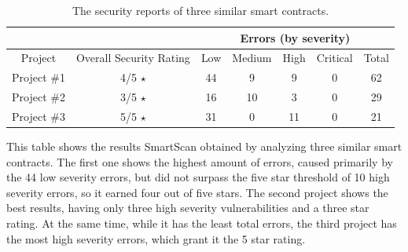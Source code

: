 \begin{table}[h]
\begin{tabular}{cc|ccccc|}
\cline{3-7}
                                  &                                               & \multicolumn{5}{c|}{Errors (by severity)}                                                                                  \\ \hline
\multicolumn{1}{|c|}{Project}     & Overall Security Rating                       & \multicolumn{1}{c|}{Low} & \multicolumn{1}{c|}{Medium} & \multicolumn{1}{c|}{High} & \multicolumn{1}{c|}{Critical} & Total \\ \hline
\multicolumn{1}{|c|}{Project \#1 \cite{sampleProject1}} & 4/5 $\star$             & \multicolumn{1}{c|}{44}  & \multicolumn{1}{c|}{9}      & \multicolumn{1}{c|}{9}    & \multicolumn{1}{c|}{0}        & 62    \\
\multicolumn{1}{|c|}{Project \#2 \cite{sampleProject2}} & 3/5 $\star$             & \multicolumn{1}{c|}{16}  & \multicolumn{1}{c|}{10}     & \multicolumn{1}{c|}{3}    & \multicolumn{1}{c|}{0}        & 29    \\
\multicolumn{1}{|c|}{Project \#3 \cite{sampleProject3}} & 5/5 $\star$             & \multicolumn{1}{c|}{31}  & \multicolumn{1}{c|}{0}      & \multicolumn{1}{c|}{11}   & \multicolumn{1}{c|}{0}        & 21    \\ \hline
\end{tabular}
\caption{The security reports of three similar smart contracts.}
\label{tab:my-table}
\end{table}

This table shows the results SmartScan obtained by analyzing three similar smart contracts. The first one shows the highest amount of errors, caused primarily by the 44 low severity errors, but did not surpass the five star threshold of 10 high severity errors, so it earned four out of five stars. The second project shows the best results, having only three high severity vulnerabilities and a three star rating. At the same time, while it has the least total errors, the third project has the most high severity errors, which grant it the 5 star rating.

